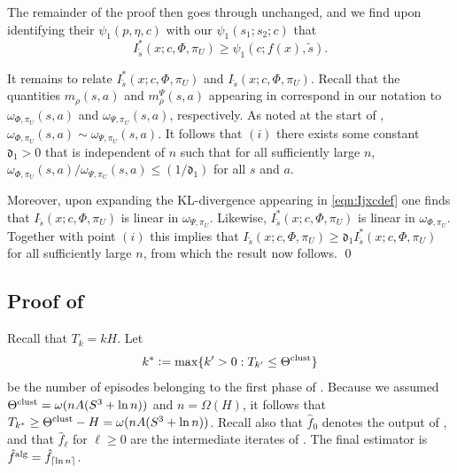 \documentclass[11pt]{article}
\newcommand{\eqdef}{\vcentcolon=}
\newcommand{\mf}[1]{\mathfrak{#1}}
\newcommand{\clust}{\textnormal{clust}}
\newcommand{\alg}{\textnormal{alg}}
\DeclarePairedDelimiter\ceil{\lceil}{\rceil}
\theoremstyle{definition}
\theoremstyle{definition}
\begin{document}
The remainder of the proof then goes through unchanged, and we find upon identifying their $\psi_1(p,\eta,c)$ with our $\psi_1(s_1;s_2;c)$ that
\begin{equation}
	I^*_{\tilde{s}}(x;c,\Phi,\pi_U)
	\geq
	\psi_1(c;f(x),\tilde{s})
	.
\end{equation}

It remains to relate $I^*_{\tilde{s}}(x;c,\Phi,\pi_U)$ and $I_{\tilde{s}}(x;c,\Phi,\pi_U)$.
Recall that the quantities $m_{\rho}(s,a)$ and $m_{\rho}^{\Psi}(s,a)$ appearing in \cite{Jedra:2022} correspond in our notation to $\omega_{\Phi,\pi_U}(s,a)$ and $\omega_{\Psi,\pi_U}(s,a)$, respectively.
As noted at the start of \cite[Appendix D.3.3]{Jedra:2022}, $\omega_{\Phi,\pi_U}(s,a)\sim \omega_{\Psi,\pi_U}(s,a)$.
It follows that $(i)$ there exists some constant $\mf{d}_1>0$ that is independent of $n$ such that for all sufficiently large $n$, $\omega_{\Phi,\pi_U}(s,a)/\allowbreak\omega_{\Psi,\pi_U}(s,a)\leq (1/\mf{d}_1)$ for all $s$ and $a$.

Moreover, upon expanding the KL-divergence appearing in \eqref{eqn:Ijxcdef} one finds that $I_{\tilde{s}}(x;c,\Phi,\pi_U)$ is linear in $\omega_{\Psi,\pi_U}$.
Likewise, $I^*_{\tilde{s}}(x;c,\Phi,\pi_U)$ is linear in $\omega_{\Phi,\pi_U}$.
Together with point $(i)$ this implies that $I_{\tilde{s}}(x;c,\Phi,\pi_U) \geq \mf{d}_1I^*_{\tilde{s}}(x;c,\Phi,\pi_U)$ for all sufficiently large $n$, from which the result now follows.
\qed

\subsection{Proof of \texorpdfstring{}{clustering performance guarantee}}
\label{sec:proof_of_clustering_bound_short}

Recall that $T_k = kH$.
Let
\begin{equation}
	\label{eqn:k-star_def}
	k^*
	\eqdef
	\max\{k'>0:T_{k'}\leq \Theta^{\clust}\}
\end{equation}
be the number of episodes belonging to the first phase of .
Because we assumed $\Theta^{\clust}=\omega(nA(S^3+\ln n))$ and $n=\Omega(H)$, it follows that $T_{k^*} \geq \Theta^{\clust}-H = \omega(nA(S^3+\ln n))$.
Recall also that $\hat{f}_0$ denotes the output of \cite[Algorithm 1]{Jedra:2022}, and that $\hat{f}_{\ell}$ for $\ell\geq 0$ are the intermediate iterates of \cite[Algorithm 2]{Jedra:2022}.
The final estimator is $\hat{f}^{\alg}=\hat{f}_{\ceil{\ln n}}$.
\end{document}
